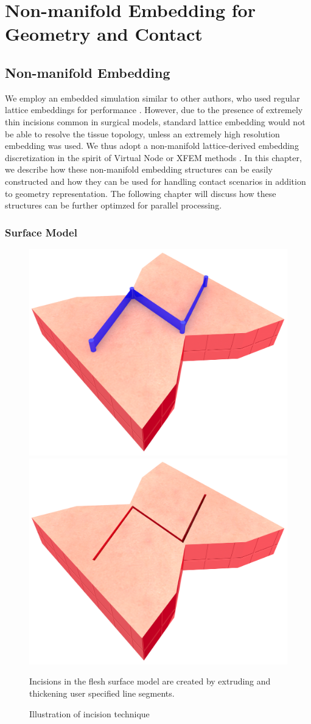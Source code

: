 \chapter{Non-manifold Embedding for Geometry and Contact}
\label{chp:nonmanifold}

\section{Non-manifold Embedding}
\label{sec:hybrid}

We employ an embedded simulation similar to other authors, who used
regular lattice embeddings for performance
\citep{MuellTG:2004,RiverJ:2007,McAdaZSETTS:2011}. However, due to the
presence of extremely thin incisions common in surgical models, standard
lattice embedding would not be able to resolve the tissue topology,
unless an extremely high resolution embedding was used. We thus adopt
a non-manifold lattice-derived embedding discretization in the spirit
of Virtual Node or XFEM methods
\citep{MolinBF:2004,SifakDF:2007,NesmeKJF:2009}.  In this chapter, we
describe how these non-manifold embedding structures can be easily
constructed and how they can be used for handling contact scenarios in
addition to geometry representation. The following chapter will
discuss how these structures can be further optimzed for parallel
processing.

\subsection{Surface Model}

\begin{figure}
\vspace*{-.23in}
  \centering
  \includegraphics[width=.45\columnwidth]{chapter_gridiron/images/Uncut_Surface_Model2.png}
  \includegraphics[width=.45\columnwidth]{chapter_gridiron/images/Cut_Surface_Model2.png}
\vspace*{-.12in}
  \caption{Illustration of incision technique}{Incisions in the flesh surface model are created by extruding and thickening user specified line segments.}
\label{fig:incision}
\end{figure}

